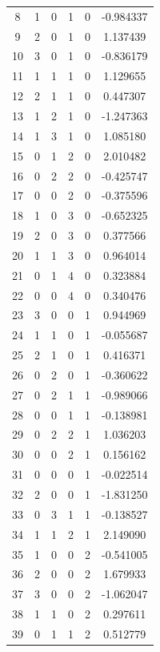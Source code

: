 \documentclass[preprint,12pt]{elsarticle}
\begin{document}
\begin{table}
\begin{minipage}[!h]{0.25\textwidth}
{\begin{tabular}{|c|cccc|c|}
8  &   1 &   0 &   1 &   0 &  -0.984337 \\
9  &   2 &   0 &   1 &   0 &   1.137439 \\
10 &   3 &   0 &   1 &   0 &  -0.836179 \\
11 &   1 &   1 &   1 &   0 &   1.129655 \\
12 &   2 &   1 &   1 &   0 &   0.447307 \\
13 &   1 &   2 &   1 &   0 &  -1.247363 \\
14 &   1 &   3 &   1 &   0 &   1.085180 \\
15 &   0 &   1 &   2 &   0 &   2.010482 \\
16 &   0 &   2 &   2 &   0 &  -0.425747 \\
17 &   0 &   0 &   2 &   0 &  -0.375596 \\
18 &   1 &   0 &   3 &   0 &  -0.652325 \\
19 &   2 &   0 &   3 &   0 &   0.377566 \\
20 &   1 &   1 &   3 &   0 &   0.964014 \\
21 &   0 &   1 &   4 &   0 &   0.323884 \\
22 &   0 &   0 &   4 &   0 &   0.340476 \\
23 &   3 &   0 &   0 &   1 &   0.944969 \\
24 &   1 &   1 &   0 &   1 &  -0.055687 \\
25 &   2 &   1 &   0 &   1 &   0.416371 \\
26 &   0 &   2 &   0 &   1 &  -0.360622 \\
27 &   0 &   2 &   1 &   1 &  -0.989066 \\
28 &   0 &   0 &   1 &   1 &  -0.138981 \\
29 &   0 &   2 &   2 &   1 &   1.036203 \\
30 &   0 &   0 &   2 &   1 &   0.156162 \\
31 &   0 &   0 &   0 &   1 &  -0.022514 \\
32 &   2 &   0 &   0 &   1 &  -1.831250 \\
33 &   0 &   3 &   1 &   1 &  -0.138527 \\
34 &   1 &   1 &   2 &   1 &   2.149090 \\
35 &   1 &   0 &   0 &   2 &  -0.541005 \\
36 &   2 &   0 &   0 &   2 &   1.679933 \\
37 &   3 &   0 &   0 &   2 &  -1.062047 \\
38 &   1 &   1 &   0 &   2 &   0.297611 \\
39 &   0 &   1 &   1 &   2 &   0.512779 \\

\end{tabular}}
\end{minipage}
\end{table}
\end{document}
